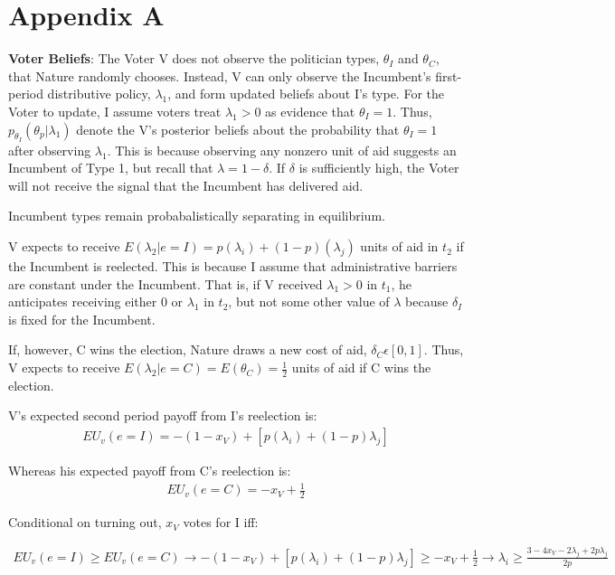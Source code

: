 \documentclass[12pt]{paper}
\begin{document}
\section*{Appendix A}
\textbf{Voter Beliefs}: The Voter V does not observe the politician types, $\theta_I$ and $\theta_C$, that Nature randomly chooses. Instead, V can only observe the Incumbent's first-period distributive policy,  $\lambda_1$, and form updated beliefs about I’s type.  For the Voter to update, I assume voters treat $\lambda_1 > 0$ as evidence that $\theta_I = 1$. Thus, $p_{\theta_I} (\theta_p | \lambda_1 )$ denote the V’s posterior beliefs about the probability that $\theta_I = 1$ after observing $\lambda_1$. This is because observing any nonzero unit of aid suggests an Incumbent of Type 1, but recall that $\lambda = 1 - \delta$. If $\delta$ is sufficiently high, the Voter will not receive the signal that the Incumbent has delivered aid.

Incumbent types remain probabalistically separating in equilibrium.

V expects to receive $E(\lambda_2 | e=I) = p(\lambda_i) + (1-p)(\lambda_j)$ units of aid in $t_2$ if the Incumbent is reelected. This is because I assume that administrative barriers are constant under the Incumbent. That is, if V received $\lambda_1 > 0$ in $t_1$, he anticipates receiving either $0$ or $\lambda_1$ in $t_2$, but not some other value of $\lambda$ because $\delta_I$ is fixed for the Incumbent.

If, however, C wins the election, Nature draws a new cost of aid, $\delta_C \epsilon [0,1]$. Thus, V expects to receive $E(\lambda_2 | e=C) = E(\theta_C) = \frac{1}{2}$ units of aid if C wins the election.

V’s expected second period payoff from I’s reelection is: 
\begin{gather}
EU_v(e = I) = -(1 - x_V) + [p(\lambda_i) + (1-p)\lambda_j] 
\end{gather}

Whereas his expected payoff from C's reelection is:
\begin{gather}
EU_v(e = C) = -x_V + \frac{1}{2}
\end{gather}

Conditional on turning out, $x_V$ votes for I iff:

\begin{gather}
EU_v(e = I) \geq EU_v(e = C) \rightarrow 
-(1 - x_V) + [p(\lambda_i) + (1-p)\lambda_j] \geq -x_V + \frac{1}{2} \rightarrow
\lambda_i \geq \frac{3 - 4x_V - 2\lambda_j + 2p\lambda_j}{2p}
\end{gather}
\end{document}
